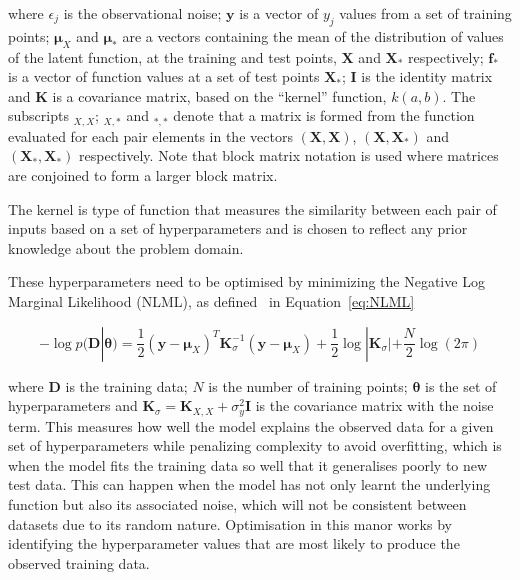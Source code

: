 \documentclass[12pt]{article}
\begin{document}
    \noindent where $\epsilon_j$ is the observational noise; $\mathbf{y}$ is a vector of $y_j$ values from a set of training points; $\boldsymbol{\mu}_X$ and $\boldsymbol{\mu}_*$ are a vectors containing the mean of the distribution of values of the latent function, at the training and test points, $\mathbf{X}$ and  $\mathbf{X}_*$ respectively; $\mathbf{f}_*$ is a vector of function values at a set of test points $\mathbf{X}_*$; $\mathbf{I}$ is the identity matrix and $\mathbf{K}$ is a covariance matrix, based on the ``kernel'' function, $k(a,b)$.
    The subscripts $_{X,X}$; $_{X,*}$ and $_{*,*}$ denote that a matrix is formed from the function evaluated for each pair elements in the vectors $(\mathbf{X},\mathbf{X})$, $(\mathbf{X},\mathbf{X}_*)$ and $(\mathbf{X}_*,\mathbf{X}_*)$ respectively.
    Note that block matrix notation is used where matrices are conjoined to form a larger block matrix.

    The kernel is type of function that measures the similarity between each pair of inputs based on a set of hyperparameters and is chosen to reflect any prior knowledge about the problem domain.

    These hyperparameters need to be optimised by minimizing the Negative Log Marginal Likelihood (NLML), as defined~\cite{murphy2023probabilistic} in Equation~\ref{eq:NLML}

    \begin{equation}
        -\log p(\mathbf{D}|\boldsymbol{\theta}) = \frac{1}{2} (\mathbf{y} - \boldsymbol{\mu}_X)^T \mathbf{K}_{\sigma}^{-1} (\mathbf{y} - \boldsymbol{\mu}_X) + \frac{1}{2} \log |\mathbf{K}_{\sigma}| + \frac{N}{2} \log(2\pi)\label{eq:NLML}
    \end{equation}


    \noindent where $\mathbf{D}$ is the training data; $N$ is the number of training points; $\boldsymbol{\theta}$ is the set of hyperparameters and $\mathbf{K}_{\sigma} = \mathbf{K}_{X,X} + \sigma^2_y \mathbf{I}$ is the covariance matrix with the noise term.
    This measures how well the model explains the observed data for a given set of hyperparameters while penalizing complexity to avoid overfitting, which is when the model fits the training data so well that it generalises poorly to new test data.
    This can happen when the model has not only learnt the underlying function but also its associated noise, which will not be consistent between datasets due to its random nature.
    Optimisation in this manor works by identifying the hyperparameter values that are most likely to produce the observed training data.
\end{document}
